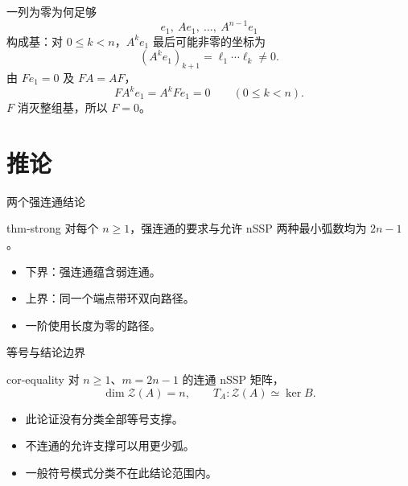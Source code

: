 \documentclass{beamer}
\begin{document}
\begin{frame}{一列为零为何足够}
\[
 e_1,\ Ae_1,\ \ldots,\ A^{n-1}e_1
\]
构成基：对 $0\leq k<n$，$A^ke_1$ 最后可能非零的坐标为
\[
 (A^ke_1)_{k+1}=\ell_1\cdots\ell_k\ne0.
\]
由 $Fe_1=0$ 及 $FA=AF$，
\[
 FA^ke_1=A^kFe_1=0\qquad(0\leq k<n).
\]
$F$ 消灭整组基，所以 $F=0$。
\end{frame}
\section{推论}
\begin{frame}{两个强连通结论}
\begin{bookresult}{thm-strong}
对每个 $n\geq1$，强连通的要求与允许 nSSP 两种最小弧数均为 $2n-1$。
\end{bookresult}
\begin{itemize}
\item 下界：强连通蕴含弱连通。
\item 上界：同一个端点带环双向路径。
\item 一阶使用长度为零的路径。
\end{itemize}
\end{frame}
\begin{frame}{等号与结论边界}
\begin{bookresult}{cor-equality}
对 $n\geq1$、$m=2n-1$ 的连通 nSSP 矩阵，
\[
 \dim\mathcal Z(A)=n,\qquad T_A:\mathcal Z(A)\simeq\ker B.
\]
\end{bookresult}
\begin{itemize}
\item 此论证没有分类全部等号支撑。
\item 不连通的允许支撑可以用更少弧。
\item 一般符号模式分类不在此结论范围内。
\end{itemize}
\end{frame}
\end{document}
